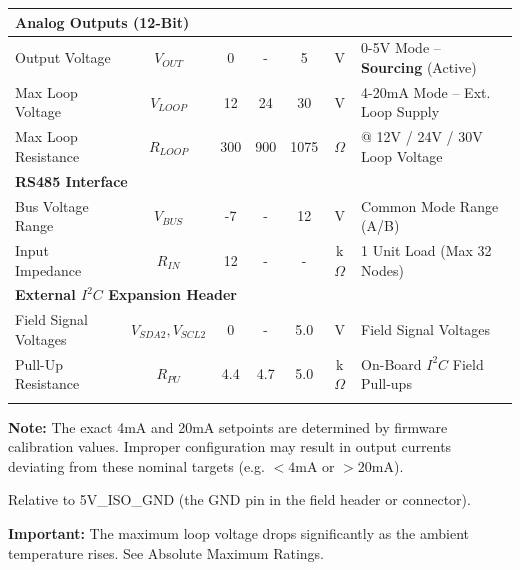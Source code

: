 \documentclass[10pt]{datasheet}
\begin{document}
\begin{table}[h]
\begin{threeparttable}
\begin{tabularx}{\textwidth}{l | c | c c c | c | X}
    \hline
    \multicolumn{7}{l}{\textbf{Analog Outputs (12-Bit)}} \\
    \hline
    Output Voltage      & $V_{OUT}$  & 0   & -   & 5   & V  & 0-5V Mode -- \textbf{Sourcing} (Active) \\
    \hline
    Max Loop Voltage\tnote{3}    & $V_{LOOP}$ & 12  & 24  & 30  & V  & 4-20mA Mode -- Ext. Loop Supply \\
    Max Loop Resistance & $R_{LOOP}$ & 300 & 900 & 1075 & $\Omega$ & @ 12V / 24V / 30V Loop Voltage \\
    \hline
    \multicolumn{7}{l}{\textbf{RS485 Interface}} \\
    \hline
    Bus Voltage Range\tnote{2}   & $V_{BUS}$  & -7  & -   & 12  & V  & Common Mode Range (A/B) \\
    Input Impedance     & $R_{IN}$   & 12  & -   & -   & k$\Omega$ & 1 Unit Load (Max 32 Nodes) \\
    \hline
    \multicolumn{7}{l}{\textbf{External $I^2C$ Expansion Header}} \\
    \hline
    Field Signal Voltages\tnote{2}      & $V_{SDA2}, V_{SCL2}$  & 0 & - & 5.0 & V  & Field Signal Voltages \\
    Pull-Up Resistance  & $R_{PU}$   & 4.4   & 4.7 & 5.0   & k$\Omega$ & On-Board $I^2C$ Field Pull-ups \\
    \thickhline
\end{tabularx}
\begin{tablenotes}
\footnotesize
\item[1] \textbf{Note:} The exact 4mA and 20mA setpoints are determined by firmware calibration values. Improper configuration may result in output currents deviating from these nominal targets (e.g. $<4$mA or $>20$mA).
\item[2] Relative to 5V\_ISO\_GND (the GND pin in the field header or connector).
\item[3] \textbf{Important:} The maximum loop voltage drops significantly as the ambient temperature rises. See Absolute Maximum Ratings.
\end{tablenotes}
\end{threeparttable}
\end{table}
\end{document}
